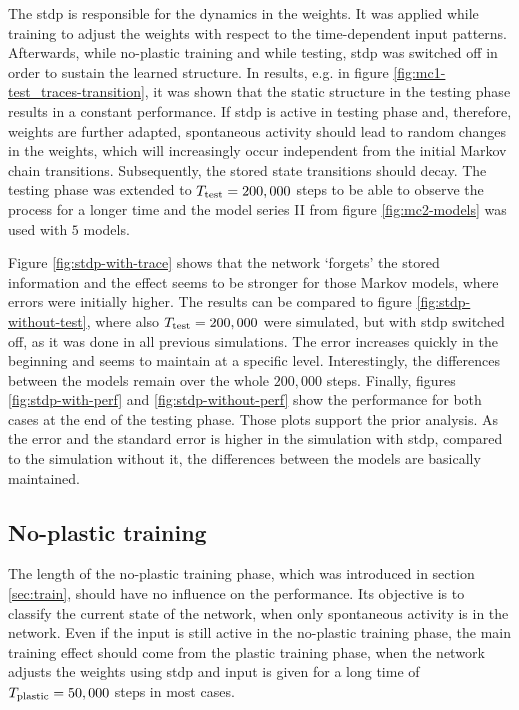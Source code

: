 The \acf{stdp} is responsible for the dynamics in the weights. It was applied while training to adjust the weights with respect to the time-dependent input patterns. Afterwards, while no-plastic training and while testing, \acs{stdp} was switched off in order to sustain the learned structure. In results, e.g. in figure \ref{fig:mc1-test_traces-transition}, it was shown that the static structure in the testing phase results in a constant performance. If \acs{stdp} is active in testing phase and, therefore, weights are further adapted, spontaneous activity should lead to random changes in the weights, which will increasingly occur independent from the initial Markov chain transitions. Subsequently, the stored state transitions should decay. The testing phase was extended to $T_{\text{test}} = 200,000$ steps to be able to observe the process for a longer time and the model series II from figure \ref{fig:mc2-models} was used with $5$ models. 

Figure \ref{fig:stdp-with-trace} shows that the network `forgets' the stored information and the effect seems to be stronger for those Markov models, where errors were initially higher. The results can be compared to figure \ref{fig:stdp-without-test}, where also $T_{\text{test}} = 200,000$ were simulated, but with \acs{stdp} switched off, as it was done in all previous simulations. The error increases quickly in the beginning and seems to maintain at a specific level. Interestingly, the differences between the models remain over the whole $200,000$ steps. Finally, figures \ref{fig:stdp-with-perf} and \ref{fig:stdp-without-perf} show the performance for both cases at the end of the testing phase. Those plots support the prior analysis. As the error and the standard error is higher in the simulation with \acs{stdp}, compared to the simulation without it, the differences between the models are basically maintained.

\newpage

\subsection{No-plastic training}
\label{sec:appendix:noplastic}

The length of the no-plastic training phase, which was introduced in section \ref{sec:train}, should have no influence on the performance. Its objective is to classify the current state of the network, when only spontaneous activity is in the network. Even if the input is still active in the no-plastic training phase, the main training effect should come from the plastic training phase, when the network adjusts the weights using \acs{stdp} and input is given for a long time of $T_{\text{plastic}} = 50,000$ steps in most cases.

